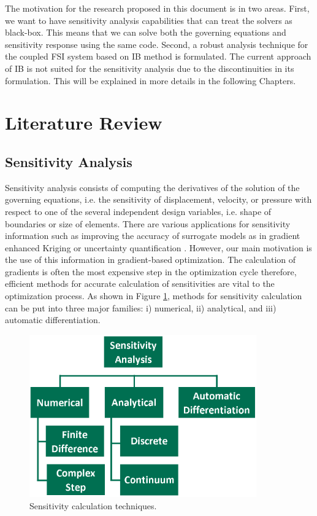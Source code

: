 The motivation for the research proposed in this document is in two areas. First, we want to have sensitivity analysis capabilities that can treat the solvers as black-box. This means that we can solve both the governing equations and sensitivity response using the same code. Second, a robust analysis technique for the coupled FSI system based on IB method is formulated. The current approach of IB is not suited for the sensitivity analysis due to the discontinuities in its formulation. This will be explained in more details in the following Chapters.

\section{Literature Review}
\subsection{Sensitivity Analysis}
Sensitivity analysis consists of computing the derivatives of the solution of the governing equations, i.e. the sensitivity of displacement, velocity, or pressure with respect to one of the several independent design variables, i.e. shape of boundaries or size of elements. There are various applications for sensitivity information such as improving the accuracy of surrogate models as in gradient enhanced Kriging \cite{han2013improving} or uncertainty quantification \cite{pettit2004uncertainty}. However, our main motivation is the use of this information in gradient-based optimization. The calculation of gradients is often the most expensive step in the optimization cycle therefore, efficient methods for accurate calculation of sensitivities are vital to the optimization process. As shown in Figure \ref{fig:C1_sensitivityTaxonomy}, methods for sensitivity calculation can be put into three major families: i) numerical, ii) analytical, and iii) automatic differentiation.

\begin{figure}[H]
	\centering
	\includegraphics[height=7.00cm]{Chapter_1/figure/sensitivity_taxonomy.png}
	\caption{Sensitivity calculation techniques.}
	\label{fig:C1_sensitivityTaxonomy}
\end{figure}

